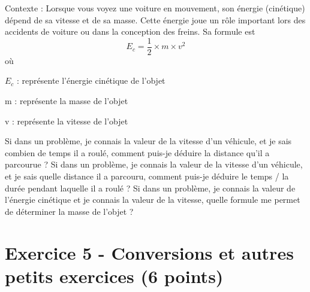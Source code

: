 \documentclass{exam}
\begin{document}
\begin{tcolorbox}[colback=gray!10!white, colframe=gray, title=Document 1 - L'énergie cinétique]
  Contexte : Lorsque vous voyez une voiture en mouvement, son énergie (cinétique) dépend de sa vitesse et de sa masse. Cette énergie joue un rôle important lors des accidents de voiture ou dans la conception des freins. Sa formule est 
  \[
  E_c = \frac{1}{2} \times m \times v^2
  \]
  où 
  \begin{addmargin}[4em]{1em}
  \begin{compactitem}
    \item [$E_c$]: représente l'énergie cinétique de l'objet
    \item [m]: représente la masse de l'objet 
    \item [v]: représente la vitesse de l'objet
\end{compactitem}
\end{addmargin}

  
\end{tcolorbox}

\begin{questions}
  \question[1] Si dans un problème, je connais la valeur de la vitesse d'un véhicule, et je sais combien de temps il a roulé, comment puis-je déduire la distance qu'il a parcourue ?
  \question[1] Si dans un problème, je connais la valeur de la vitesse d'un véhicule, et je sais quelle distance il a parcouru, comment puis-je déduire le temps / la durée pendant laquelle il a roulé ?
  \question[1] Si dans un problème, je connais la valeur de l'énergie cinétique et je connais la valeur de la vitesse, quelle formule me permet de déterminer la masse de l'objet ?
\end{questions}

\section*{Exercice 5 - Conversions et autres petits exercices (6 points)}
\end{document}
